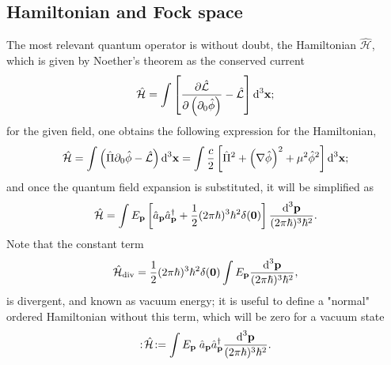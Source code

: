\subsection*{Hamiltonian and Fock space}
The most relevant quantum operator is without doubt, the Hamiltonian $\hat{\mathcal{H}}$, which is given by Noether's theorem as the conserved current
\begin{equation}
	\hat{\mathcal{H}}=\int\left[\frac{\partial\hat{\mathcal{L}}}{\partial\left(\partial_0\hat{\phi}\right)}-\hat{\mathcal{L}}\right]\text{d}^3\mathbf{x};
\end{equation}
for the given field, one obtains the following expression for the Hamiltonian,
\begin{equation}
	\hat{\mathcal{H}}=\int\left(\hat{\Pi}\partial_{0}\hat{\phi}-\hat{\mathcal{L}}\right)\text{d}^3\mathbf{x}=\int\frac{c}{2}\left[\hat{\Pi}^2+\left(\mathbf{\nabla}\hat{\phi}\right)^2+\mu^2\hat{\phi}^2\right]\text{d}^3\mathbf{x};
\end{equation}
and once the quantum field expansion is substituted, it will be simplified as
\begin{equation}
	\hat{\mathcal{H}}=\int E_\mathbf{p}\left[\hat{a}_\mathbf{p}\hat{a}_\mathbf{p}^\dagger+\frac{1}{2}(2\pi\hbar)^3\hbar^2\delta(\mathbf{0})\right]\frac{\text{d}^3\mathbf{p}}{(2\pi\hbar)^3\hbar^2}.
\end{equation}
Note that the constant term
\begin{equation}
	\hat{\mathcal{H}}_{\text{div}}=\frac{1}{2}(2\pi\hbar)^3\hbar^2\delta(\mathbf{0})\int E_\mathbf{p}\frac{\text{d}^3\mathbf{p}}{(2\pi\hbar)^3\hbar^2},
\end{equation}
is divergent, and known as vacuum energy; it is useful to define a "normal" ordered Hamiltonian without this term, which will be zero for a vacuum state
\begin{equation}
	:\!\hat{\mathcal{H}}\!:=\int E_\mathbf{p}\;\hat{a}_\mathbf{p}\hat{a}_\mathbf{p}^\dagger\frac{\text{d}^3\mathbf{p}}{(2\pi\hbar)^3\hbar^2}.
\end{equation}

